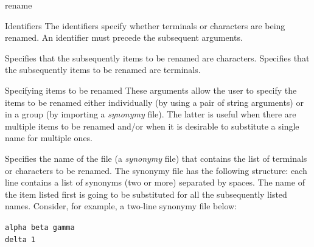 \begin{command}{rename}{}
    \begin{arguments}
		\begin{argumentgroup}{Identifiers}
		{The identifiers specify whether terminals or characters are being
        renamed. An identifier must precede the subsequent arguments.}
		
            {Specifies that the subsequently items to be renamed are characters.} 
            {}
            {Specifies that the subsequently items to be renamed are terminals.} 
            {}
	\end{argumentgroup}
	      
	      \begin{argumentgroup}{Specifying items to be renamed}
	      {These arguments allow the user to specify the items to be renamed either individually (by 
	      using a pair of string arguments) or in a group (by importing a \emph{synonymy} file).
	      The latter is useful when there are multiple items to be renamed and/or when it is
	      desirable to substitute a single name for  multiple ones.}
	      
                {Specifies the name of the file (a \emph{synonymy} file) that contains the list of
                terminals or characters to be renamed. The synonymy file has the following structure:
                each line contains a list of synonyms (two or more) separated by spaces. The name of the
                item listed first is going to be substituted for all the subsequently listed names. Consider,
                for example, a two-line synonymy file below:
                
                \texttt{alpha beta gamma \\
                delta 1\\}
                 
}
\end{argumentgroup}
\end{arguments}
\end{command}
